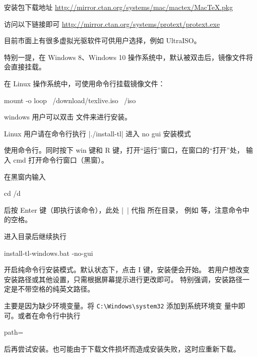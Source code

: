 
\MacTeX{} 安装包下载地址 \url{http://mirror.ctan.org/systems/mac/mactex/MacTeX.pkg}



访问以下链接即可 \url{http://mirror.ctan.org/systems/protext/protext.exe}



目前市面上有很多虚拟光驱软件可供用户选择，例如 UltraISO。

特别一提，在 Windows 8、Windows 10
操作系统中，默认被双击后，镜像文件将会直接挂载。

在 Linux 操作系统中，可使用命令行挂载镜像文件：
\begin{shcode}
  mount -o loop ~/download/texlive.iso ~/iso
\end{shcode}



windows 用户可以双击  文件来进行安装。

Linux 用户请在命令行执行 |./install-tl| 进入 no gui 安装模式



使用命令行。同时按下 win 键和 R 键，打开“运行”窗口，在窗口的“打开”处，
输入 cmd 打开命令行窗口（黑窗）。

在黑窗内输入
\begin{shcode}
  cd /d ~
\end{shcode}
后按 Enter 键（即执行该命令），此处 |~| 代指  
所在目录，
例如  等，注意命令中的空格。

进入目录后继续执行
\begin{shcode}
  install-tl-windows.bat -no-gui
\end{shcode}
开启纯命令行安装模式。默认状态下，点击 I 键，安装便会开始。
若用户想改变安装路径或其他设置，只需根据屏幕提示进行更改即可。
特别强调，安装路径一定是不带空格的纯英文路径。



主要是因为缺少环境变量。将 \verb|C:\Windows\system32| 添加到系统环境变
量中即可。或者在命令行中执行
\begin{shcode}
  path=%
\end{shcode}
后再尝试安装。也可能由于下载文件损坏而造成安装失败，这时应重新下载。


